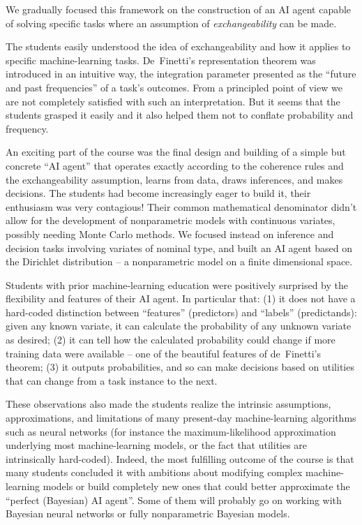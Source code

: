 We gradually focused this framework on the construction of an AI agent capable of solving specific tasks where an assumption of \emph{exchangeability} can be made.

The students easily understood the idea of exchangeability and how it applies to specific machine-learning tasks. De~Finetti's representation theorem was introduced in an intuitive way, the integration parameter presented as the ``future and past frequencies'' of a task's outcomes. From a principled point of view we are not completely satisfied with such an interpretation. But it seems that the students grasped it easily and it also helped them not to conflate probability and frequency.

An exciting part of the course was the final design and building of a simple but concrete ``AI agent'' that operates exactly according to the coherence rules and the exchangeability assumption, learns from data, draws inferences, and makes decisions. The students had become increasingly eager to build it, their enthusiasm was very contagious! Their common mathematical denominator didn't allow for the development of nonparametric models with continuous variates, possibly needing Monte Carlo methods. We focused instead on inference and decision tasks involving variates of nominal type, and built an AI agent based on the Dirichlet distribution -- a nonparametric model on a finite dimensional space.

Students with prior machine-learning education were positively surprised by the flexibility and features of their AI agent. In particular that: (1) it does not have a hard-coded distinction between ``features'' (predictors) and ``labels'' (predictands): given any known variate, it can calculate the probability of any unknown variate as desired; (2) it can tell how the calculated probability could change if more training data were available -- one of the beautiful features of de~Finetti's theorem; (3) it outputs probabilities, and so can make decisions based on utilities that can change from a task instance to the next.

These observations also made the students realize the intrinsic assumptions, approximations, and limitations of many present-day machine-learning algorithms such as neural networks (for instance the maximum-likelihood approximation underlying most machine-learning models, or the fact that utilities are intrinsically hard-coded). Indeed, the most fulfilling outcome of the course is that many students concluded it with ambitions about modifying complex machine-learning models or build completely new ones that could better approximate the ``perfect (Bayesian) AI agent''. Some of them will probably go on working with Bayesian neural networks or fully nonparametric Bayesian models.

